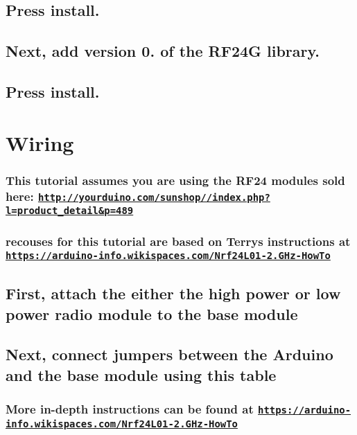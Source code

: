  \subsection*{Press install.}

\subsection*{Next, add version 0. of the R\+F24G library.}

 \subsection*{Press install.}

\section*{Wiring}

\subsubsection*{This tutorial assumes you are using the R\+F24 modules sold here\+: \href{http://yourduino.com/sunshop//index.php?l=product_detail&p=489}{\tt http\+://yourduino.\+com/sunshop//index.\+php?l=product\+\_\+detail\&p=489}}

\subsubsection*{recouses for this tutorial are based on Terry\textquotesingle{}s instructions at \href{https://arduino-info.wikispaces.com/Nrf24L01-2.4GHz-HowTo}{\tt https\+://arduino-\/info.\+wikispaces.\+com/\+Nrf24\+L01-\/2.\+G\+Hz-\/\+How\+To}}

\subsection*{First, attach the either the high power or low power radio module to the base module}

  \subsection*{Next, connect jumpers between the Arduino and the base module using this table}

 \subsubsection*{More in-\/depth instructions can be found at \href{https://arduino-info.wikispaces.com/Nrf24L01-2.4GHz-HowTo}{\tt https\+://arduino-\/info.\+wikispaces.\+com/\+Nrf24\+L01-\/2.\+G\+Hz-\/\+How\+To}}

